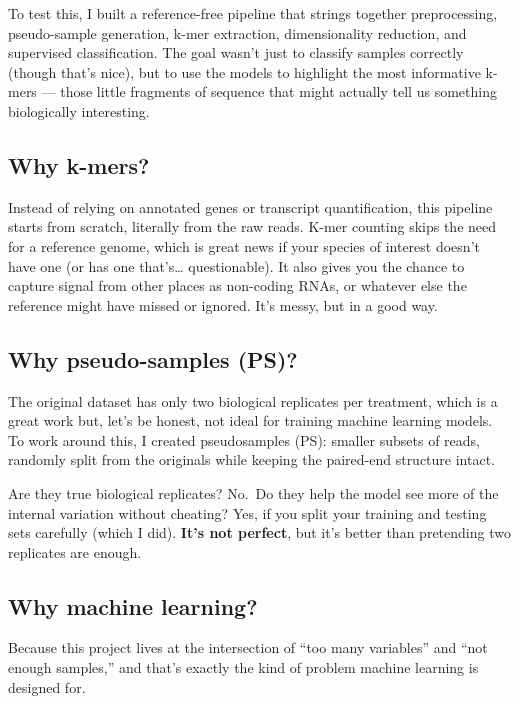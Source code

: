 \documentclass[
]{book}
\begin{document}
To test this, I built a reference-free pipeline that strings together preprocessing, pseudo-sample generation, k-mer extraction, dimensionality reduction, and supervised classification. The goal wasn't just to classify samples correctly (though that's nice), but to use the models to highlight the most informative k-mers --- those little fragments of sequence that might actually tell us something biologically interesting.

\hypertarget{why-k-mers}{%
\subsection{Why k-mers?}\label{why-k-mers}}

Instead of relying on annotated genes or transcript quantification, this pipeline starts from scratch, literally from the raw reads. K-mer counting skips the need for a reference genome, which is great news if your species of interest doesn't have one (or has one that's\ldots{} questionable). It also gives you the chance to capture signal from other places as non-coding RNAs, or whatever else the reference might have missed or ignored. It's messy, but in a good way.

\hypertarget{why-pseudo-samples-ps}{%
\subsection{Why pseudo-samples (PS)?}\label{why-pseudo-samples-ps}}

The original dataset has only two biological replicates per treatment, which is a great work but, let's be honest, not ideal for training machine learning models. To work around this, I created pseudosamples (PS): smaller subsets of reads, randomly split from the originals while keeping the paired-end structure intact.

Are they true biological replicates? No.~Do they help the model see more of the internal variation without cheating? Yes, if you split your training and testing sets carefully (which I did). \textbf{It's not perfect}, but it's better than pretending two replicates are enough.

\hypertarget{why-machine-learning}{%
\subsection{Why machine learning?}\label{why-machine-learning}}

Because this project lives at the intersection of ``too many variables'' and ``not enough samples,'' and that's exactly the kind of problem machine learning is designed for.
\end{document}
